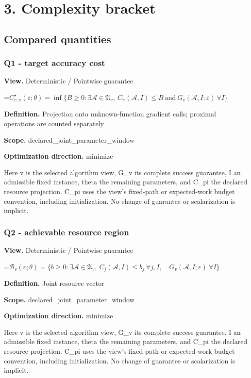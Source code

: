 \documentclass[10pt,a4paper]{article}
\newcommand{\AtlasMath}[1]{\par\begingroup\centering\setbox0=\hbox{$\displaystyle #1$}\ifdim\wd0>1.4\linewidth\typeout{ATLAS WIDE FORMULA: \the\wd0}\fi\ifdim\wd0>\linewidth\resizebox{\linewidth}{!}{\box0}\else\box0\fi\par\endgroup}
\begin{document}
\section{3. Complexity bracket}
\subsection{Compared quantities}
\subsubsection{Q1 - target accuracy cost}
\textbf{View.} Deterministic / Pointwise guarantee

\AtlasMath{C^\star_{v,\pi}(\varepsilon;\theta)=\inf\{B\ge0:\exists\mathcal A\in\mathfrak A_v,\ C_\pi(\mathcal A,I)\le B\ \text{and}\ G_v(\mathcal A,I;\varepsilon)\ \forall I\}}
\textbf{Definition.} Projection onto unknown-function gradient calls; proximal operations are counted separately

\textbf{Scope.} declared\_joint\_parameter\_window

\textbf{Optimization direction.} minimize

Here v is the selected algorithm view, G\_v its complete success guarantee, I an admissible fixed instance, theta the remaining parameters, and C\_pi the declared resource projection. C\_pi uses the view's fixed-path or expected-work budget convention, including initialization. No change of guarantee or scalarization is implicit.

\subsubsection{Q2 - achievable resource region}
\textbf{View.} Deterministic / Pointwise guarantee

\AtlasMath{\mathcal B_v(\varepsilon;\theta)=\{b\ge0:\exists\mathcal A\in\mathfrak A_v,\ C_j(\mathcal A,I)\le b_j\ \forall j,I,\quad G_v(\mathcal A,I;\varepsilon)\ \forall I\}}
\textbf{Definition.} Joint resource vector

\textbf{Scope.} declared\_joint\_parameter\_window

\textbf{Optimization direction.} minimize

Here v is the selected algorithm view, G\_v its complete success guarantee, I an admissible fixed instance, theta the remaining parameters, and C\_pi the declared resource projection. C\_pi uses the view's fixed-path or expected-work budget convention, including initialization. No change of guarantee or scalarization is implicit.
\end{document}
